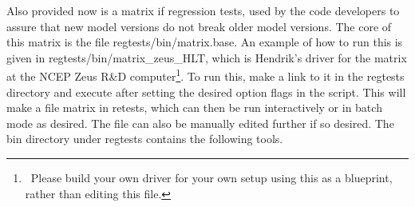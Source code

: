 \begin{flist}
\end{flist}

\noindent
Also provided now is a matrix if regression tests, used by the code developers
to assure that new model versions do not break older model versions. The core
of this matrix is the file {\file regtests/bin/matrix.base}. An example of how
to run this is given in {\file regtests/bin/matrix\_zeus\_HLT}, which is
Hendrik's driver for the matrix at the NCEP Zeus R\&D
computer\footnote{~Please build your own driver for your own setup using this
  as a blueprint, rather than editing this file.}. To run this, make a link to
it in the {\file regtests} directory and execute after setting the desired
option flags in the script. This will make a file {\file matrix} in {\file
  retests}, which can then be run interactively or in batch mode as
desired. The file can also be manually edited further if so desired. The
{\file bin} directory under {\file regtests} contains the following tools.

\begin{flist}
\end{flist}

